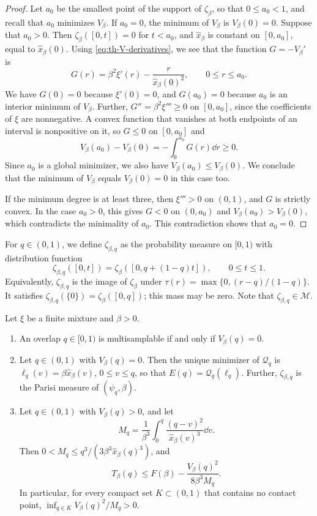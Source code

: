 \begin{proof}
Let $a_0$ be the smallest point of the support of $\zeta_\beta$, so that $0\le a_0<1$, and recall that $a_0$ minimizes $V_\beta$. If $a_0=0$, the minimum of $V_\beta$ is $V_\beta(0)=0$. Suppose that $a_0>0$. Then $\zeta_\beta([0,t])=0$ for $t<a_0$, and $\hat x_\beta$ is constant on $[0,a_0]$, equal to $\hat x_\beta(0)$. Using \eqref{eq:th-V-derivatives}, we see that the function $G=-V_\beta'$ is
\[
G(r)=\beta^2\xi'(r)-\frac r{\hat x_\beta(0)^2},\qquad 0\le r\le a_0.
\]
We have $G(0)=0$ because $\xi'(0)=0$, and $G(a_0)=0$ because $a_0$ is an interior minimum of $V_\beta$. Further, $G''=\beta^2\xi'''\ge0$ on $[0,a_0]$, since the coefficients of $\xi$ are nonnegative. A convex function that vanishes at both endpoints of an interval is nonpositive on it, so $G\le0$ on $[0,a_0]$ and
\[
V_\beta(a_0)-V_\beta(0)=-\int_0^{a_0}G(r)\dd r\ge0.
\]
Since $a_0$ is a global minimizer, we also have $V_\beta(a_0)\le V_\beta(0)$. We conclude that the minimum of $V_\beta$ equals $V_\beta(0)=0$ in this case too.

If the minimum degree is at least three, then $\xi'''>0$ on $(0,1)$, and $G$ is strictly convex. In the case $a_0>0$, this gives $G<0$ on $(0,a_0)$ and $V_\beta(a_0)>V_\beta(0)$, which contradicts the minimality of $a_0$. This contradiction shows that $a_0=0$.
\end{proof}

For $q\in(0,1)$, we define $\zeta_{\beta,q}$ as the probability measure on $[0,1)$ with distribution function
\begin{equation}\label{eq:th-residual-measure}
\zeta_{\beta,q}([0,t])=\zeta_\beta([0,q+(1-q)t]),\qquad 0\le t\le1.
\end{equation}
Equivalently, $\zeta_{\beta,q}$ is the image of $\zeta_\beta$ under $\tau(r)=\max\{0,(r-q)/(1-q)\}$. It satisfies $\zeta_{\beta,q}(\{0\})=\zeta_\beta([0,q])$; this mass may be zero. Note that $\zeta_{\beta,q}\in\mathscr M$.

\begin{theorem}\label{thm:th-contact}
Let $\xi$ be a finite mixture and $\beta>0$.
\begin{enumerate}
\item An overlap $q\in[0,1)$ is multisamplable if and only if $V_\beta(q)=0$.
\item Let $q\in(0,1)$ with $V_\beta(q)=0$. Then the unique minimizer of $\mathcal Q_q$ is $\ell_q(v)=\beta\hat x_\beta(v)$, $0\le v\le q$, so that $E(q)=\mathcal Q_q(\ell_q)$. Further, $\zeta_{\beta,q}$ is the Parisi measure of $(\psi_q,\beta)$.
\item Let $q\in(0,1)$ with $V_\beta(q)>0$, and let
\[
M_q=\frac1{\beta^3}\int_0^q\frac{(q-v)^2}{\hat x_\beta(v)^3}\dd v.
\]
Then $0<M_q\le q^3/(3\beta^3\hat x_\beta(q)^3)$, and
\begin{equation}\label{eq:th-gap}
T_\beta(q)\le F(\beta)-\frac{V_\beta(q)^2}{8\beta^3M_q}.
\end{equation}
In particular, for every compact set $K\subset(0,1)$ that contains no contact point, $\inf_{q\in K}V_\beta(q)^2/M_q>0$.
\end{enumerate}
\end{theorem}

